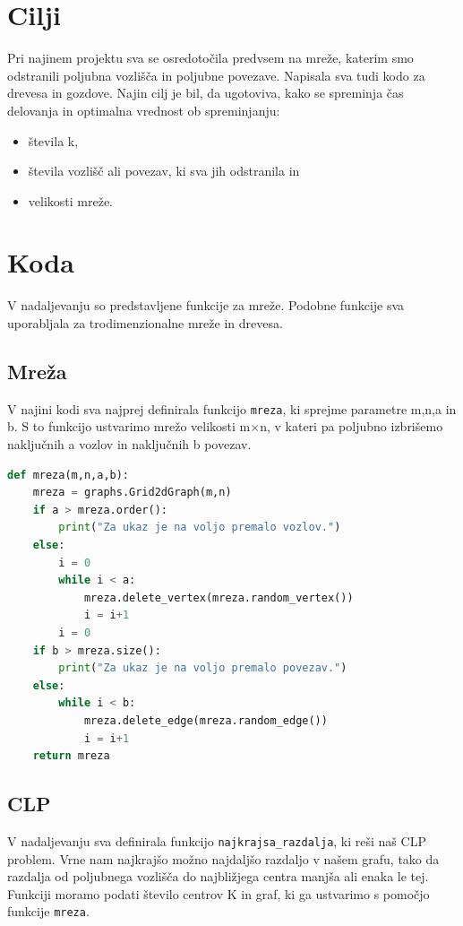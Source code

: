 \documentclass[a4paper]{article}
\begin{document}
\section{Cilji}
Pri najinem projektu sva se osredotočila predvsem na mreže, katerim smo odstranili poljubna vozlišča in poljubne povezave. Napisala sva tudi kodo za drevesa in gozdove.
Najin cilj je bil, da ugotoviva, kako se spreminja čas delovanja in optimalna vrednost ob spreminjanju:
\begin{itemize}
\item{števila k,}
\item{števila vozlišč ali povezav, ki sva jih odstranila in}
\item{velikosti mreže.}
\end{itemize}

\section{Koda}
V nadaljevanju so predstavljene funkcije za mreže. Podobne funkcije sva uporabljala za trodimenzionalne mreže in drevesa.

\subsection{Mreža}
V najini kodi sva najprej definirala funkcijo \texttt{mreza}, ki sprejme parametre m,n,a in b. S to funkcijo ustvarimo mrežo velikosti m$\times$n, v kateri pa poljubno izbrišemo naključnih a vozlov in naključnih b povezav.\\

\begin{lstlisting}[language=Python]
def mreza(m,n,a,b):
    mreza = graphs.Grid2dGraph(m,n)
    if a > mreza.order():
        print("Za ukaz je na voljo premalo vozlov.")
    else:
        i = 0
        while i < a:
            mreza.delete_vertex(mreza.random_vertex())
            i = i+1
        i = 0
    if b > mreza.size():
        print("Za ukaz je na voljo premalo povezav.")
    else:
        while i < b:
            mreza.delete_edge(mreza.random_edge())
            i = i+1
    return mreza
\end{lstlisting}

\subsection{CLP}
V nadaljevanju sva definirala funkcijo \texttt{najkrajsa\_razdalja}, ki reši naš CLP problem. Vrne nam najkrajšo možno najdaljšo razdaljo v našem grafu, tako da razdalja od poljubnega vozlišča do najbližjega centra manjša ali enaka le tej. Funkciji moramo podati število centrov K in graf, ki ga ustvarimo s pomočjo funkcije  \texttt{mreza}.
\end{document}
